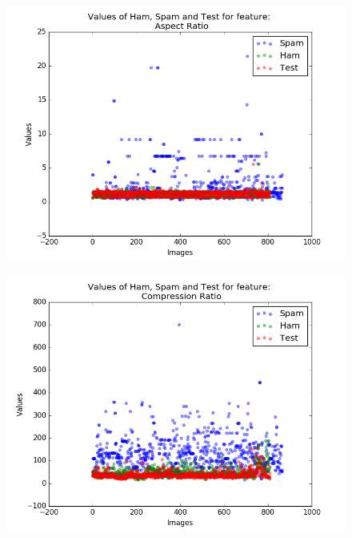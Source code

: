 \begin{figure}[h]
	\centering
	\begin{minipage}{.5\textwidth}
		\centering
		\includegraphics[width=\linewidth]{images/appA/AspectRatio_values_scatter} 
		\label{fig:AspectRatio_values_scatter}
	\end{minipage}%
	\begin{minipage}{.5\textwidth}
		\centering
		\includegraphics[width=\linewidth]{images/appA/CompressionRatio_values_scatter}
		\label{fig:CompressionRatio_values_scatter}
	\end{minipage}
\end{figure}



